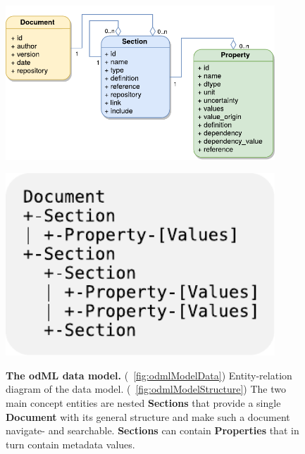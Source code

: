 \documentclass{article}
\begin{document}
\begin{figure}
   \begin{minipage}[b]{.6\linewidth}
     \centering
     \includegraphics[width=0.9\textwidth]{figures/figOdmlModelA.pdf}
     \label{fig:odmlModelData}
   \end{minipage}
   \hfill
   \begin{minipage}[b]{.35\linewidth}
     \centering
     \includegraphics[width=0.9\textwidth]{figures/figOdmlModelB.pdf}
     \label{fig:odmlModelStructure}
   \end{minipage}
   \caption{\textbf{The odML data model.}
(~\ref{fig:odmlModelData}) Entity-relation diagram of the data model. (~\ref{fig:odmlModelStructure}) The two main concept entities are nested \textbf{Sections} that provide a single \textbf{Document} with its general structure and make such a document navigate- and searchable. \textbf{Sections} can contain \textbf{Properties} that in turn contain metadata values.}
   \label{fig:odmlModel}
\end{figure}
\end{document}
